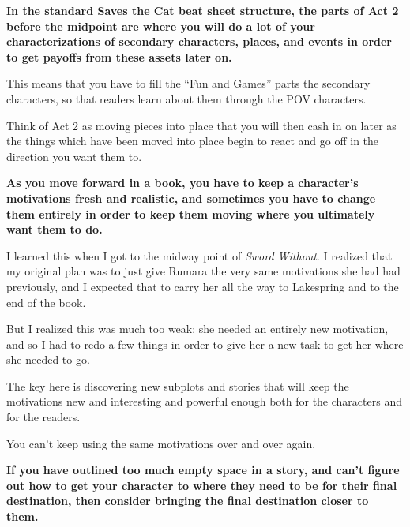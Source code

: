 	\begin{compactdesc}
	
		\item[\tr{001}] \textbf{In the standard Saves the Cat beat sheet structure, the parts of Act 2 before the midpoint are where you will do a lot of your characterizations of secondary characters, places, and events in order to get payoffs from these assets later on.}
			\begin{compactitem}
				\item This means that you have to fill the ``Fun and Games'' parts the secondary characters, so that readers learn about them through the POV characters.
				\item Think of Act 2 as moving pieces into place that you will then cash in on later as the things which have been moved into place begin to react and go off in the direction you want them to.
			\end{compactitem}
			
		\item[\tr{002}] \textbf{As you move forward in a book, you have to keep a character's motivations fresh and realistic, and sometimes you have to change them entirely in order to keep them moving where you ultimately want them to do.}
			\begin{compactitem}
				\item I learned this when I got to the midway point of \textit{Sword Without}. I realized that my original plan was to just give Rumara the very same motivations she had had previously, and I expected that to carry her all the way to Lakespring and to the end of the book.
				\item But I realized this was much too weak; she needed an entirely new motivation, and so I had to redo a few things in order to give her a new task to get her where she needed to go.
				\item The key here is discovering new subplots and stories that will keep the motivations new and interesting and powerful enough both for the characters and for the readers.
				\item You can't keep using the same motivations over and over again.
			\end{compactitem}
			
		\item[\tr{003}] \textbf{If you have outlined too much empty space in a story, and can't figure out how to get your character to where they need to be for their final destination, then consider bringing the final destination closer to them.}
		

\end{compactdesc}
